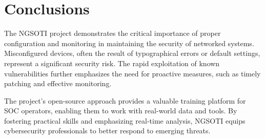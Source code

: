 \documentclass[10pt,a4paper]{report}
\begin{document}
\chapter{Conclusions}
The NGSOTI project demonstrates the critical importance of proper configuration and monitoring in maintaining the security of networked systems. Misconfigured devices, often the result of typographical errors or default settings, represent a significant security risk. The rapid exploitation of known vulnerabilities further emphasizes the need for proactive measures, such as timely patching and effective monitoring.

The project's open-source approach provides a valuable training platform for SOC operators, enabling them to work with real-world data and tools. By fostering practical skills and emphasizing real-time analysis, NGSOTI equips cybersecurity professionals to better respond to emerging threats.


\end{document}
